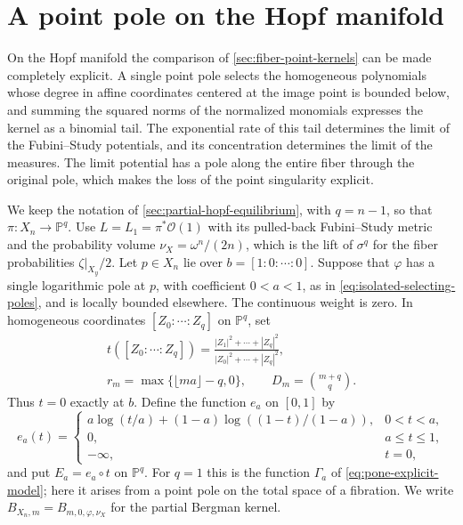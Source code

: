 \section{A point pole on the Hopf manifold}
\label{sec:hopf-point-equilibrium}

On the Hopf manifold the comparison of \cref{sec:fiber-point-kernels} can be made completely explicit. A single point pole selects the homogeneous polynomials whose degree in affine coordinates centered at the image point is bounded below, and summing the squared norms of the normalized monomials expresses the kernel as a binomial tail. The exponential rate of this tail determines the limit of the Fubini--Study potentials, and its concentration determines the limit of the measures. The limit potential has a pole along the entire fiber through the original pole, which makes the loss of the point singularity explicit.

We keep the notation of \cref{sec:partial-hopf-equilibrium}, with $q=n-1$, so that $\pi\colon X_n\to\mathbb P^q$. Use $L=L_1=\pi^*\mathcal O(1)$ with its pulled-back Fubini--Study metric and the probability volume $\nu_X=\omega^n/(2n)$, which is the lift of $\sigma^q$ for the fiber probabilities $\zeta|_{X_y}/2$. Let $p\in X_n$ lie over $b=[1:0:\cdots:0]$. Suppose that $\varphi$ has a single logarithmic pole at $p$, with coefficient $0<a<1$, as in \eqref{eq:isolated-selecting-poles}, and is locally bounded elsewhere. The continuous weight is zero. In homogeneous coordinates $[Z_0:\cdots:Z_q]$ on $\mathbb P^q$, set
\[
 \begin{gathered}
 t([Z_0:\cdots:Z_q])=
       \frac{|Z_1|^2+\cdots+|Z_q|^2}{|Z_0|^2+\cdots+|Z_q|^2},\\
 r_m=\max\{\lfloor ma\rfloor-q,0\},
 \qquad D_m=\binom{m+q}{q}.
 \end{gathered}
\]
Thus $t=0$ exactly at $b$. Define the function $e_a$ on $[0,1]$ by
\begin{equation}\label{eq:point-equilibrium-function}
 e_a(t)=
 \begin{cases}
 a\log(t/a)+(1-a)\log((1-t)/(1-a)),&0<t<a,\\
 0,&a\leq t\leq1,\\
 -\infty,&t=0,
 \end{cases}
\end{equation}
and put $E_a=e_a\circ t$ on $\mathbb P^q$. For $q=1$ this is the function $\Gamma_a$ of \eqref{eq:pone-explicit-model}; here it arises from a point pole on the total space of a fibration. We write $B_{X_n,m}=B_{m,0,\varphi,\nu_X}$ for the partial Bergman kernel.

